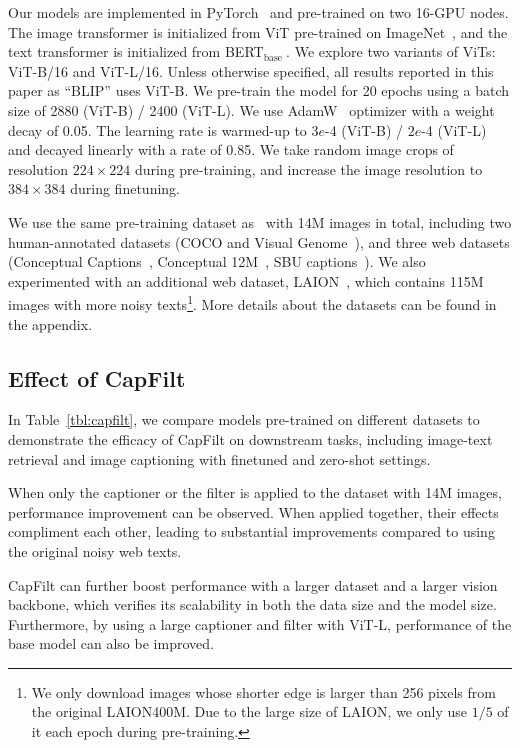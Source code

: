 Our models are implemented in PyTorch~\cite{pytorch} and pre-trained on two 16-GPU nodes. The image transformer is initialized from ViT pre-trained on ImageNet~\cite{deit,vit}, and the text transformer is initialized from BERT$_\mathrm{base}~$\cite{bert}.
We explore two variants of ViTs: ViT-B/16 and ViT-L/16. Unless otherwise specified, all results reported in this paper as ``BLIP'' uses ViT-B. We pre-train the model for 20 epochs using a batch size of 2880 (ViT-B) / 2400 (ViT-L). We use AdamW~\cite{adamw} optimizer with a weight decay of 0.05. The learning rate is warmed-up to $3e$-4 (ViT-B) / $2e$-4 (ViT-L) and decayed linearly with a rate of 0.85. We take random image crops of resolution $224\times224$ during pre-training, and increase the image resolution to $384\times384$ during finetuning.

We use the same pre-training dataset as~\citet{ALBEF} with 14M images in total, including two human-annotated datasets (COCO and Visual Genome~\cite{VG}), and three web datasets (Conceptual Captions~\cite{cc12m}, Conceptual 12M~\cite{cc12m}, SBU captions~\cite{sbu}). We also experimented with an additional web dataset, LAION~\cite{laion}, which contains 115M images with more noisy texts\footnote{We only download images whose shorter edge is larger than 256 pixels from the original LAION400M. Due to the large size of LAION, we only use $1/5$ of it each epoch during pre-training.}. More details about the datasets can be found in the appendix.

\subsection{Effect of CapFilt}

In Table~\ref{tbl:capfilt},
we compare models pre-trained on different datasets to demonstrate the efficacy of CapFilt on downstream tasks, including image-text retrieval and image captioning with finetuned and zero-shot settings.

When only the captioner or the filter is applied to the dataset with 14M images, performance improvement can be observed. When applied together, their effects compliment each other, leading to substantial improvements compared to using the original noisy web texts.

CapFilt can further boost performance with a larger dataset and a larger vision backbone, which verifies its scalability in both the data size and the model size. Furthermore, by using a large captioner and filter with ViT-L, performance of the base model can also be improved.

